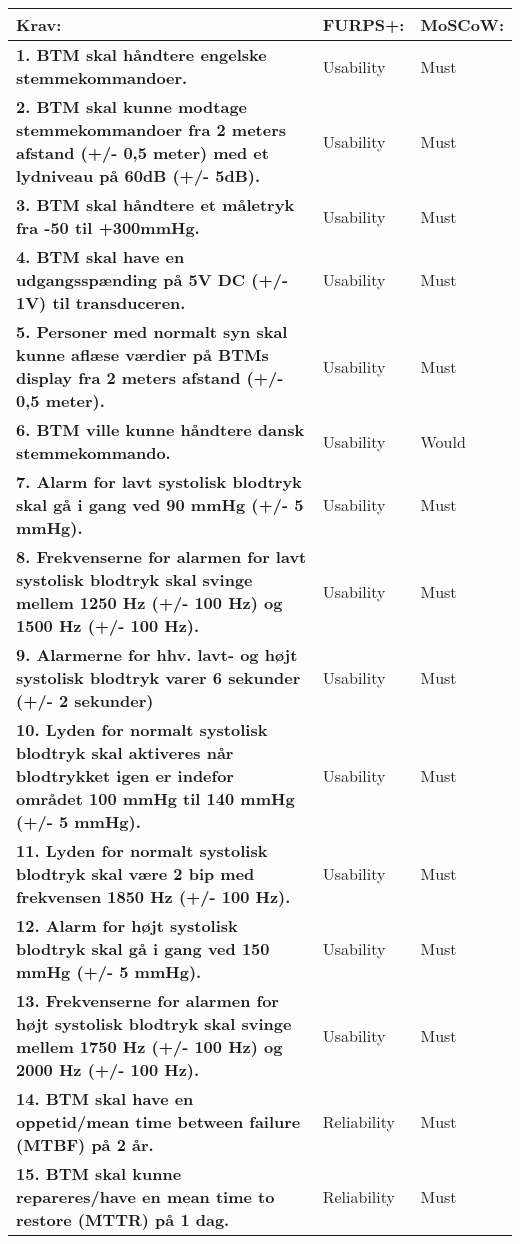 \begin{table} [htbp]
\centering
\begin{tabular}{|p{10cm}|l|l|}
\hline
\textbf{Krav:} & \textbf{FURPS+:} & \textbf{MoSCoW:} \\ \hline
\textbf{1. BTM skal håndtere engelske stemmekommandoer. } & Usability & Must \\\hline
\textbf{2. BTM skal kunne modtage stemmekommandoer fra 2 meters afstand (+/- 0,5 meter) med et lydniveau på 60dB (+/- 5dB).} & Usability & Must \\ \hline
\textbf{3. BTM skal håndtere et måletryk fra -50 til +300mmHg. }  & Usability & Must \\ \hline 
\textbf{4. BTM skal have en udgangsspænding på 5V DC (+/- 1V) til transduceren.} & Usability & Must \\ \hline
\textbf{5. Personer med normalt syn skal kunne aflæse værdier på BTMs display fra 2 meters afstand (+/- 0,5 meter). } & Usability & Must \\ \hline
\textbf{6. BTM ville kunne håndtere dansk stemmekommando.} & Usability & Would \\ \hline
\textbf{7. Alarm for lavt systolisk blodtryk skal gå i gang ved 90 mmHg (+/- 5 mmHg).} & Usability & Must \\ \hline
\textbf{8. Frekvenserne for alarmen for lavt systolisk blodtryk skal svinge mellem 1250 Hz (+/- 100 Hz) og 1500 Hz (+/- 100 Hz).} & Usability & Must \\ \hline
\textbf{9. Alarmerne for hhv. lavt- og højt systolisk blodtryk varer 6 sekunder (+/- 2 sekunder)} & Usability & Must \\ \hline
\textbf{10. Lyden for normalt systolisk blodtryk skal aktiveres når blodtrykket igen er indefor området 100 mmHg til 140 mmHg (+/- 5 mmHg).} & Usability & Must \\ \hline
\textbf{11. Lyden for normalt systolisk blodtryk skal være 2 bip med frekvensen 1850 Hz (+/- 100 Hz).} & Usability & Must \\ \hline
\textbf{12. Alarm for højt systolisk blodtryk skal gå i gang ved 150 mmHg (+/- 5 mmHg).} & Usability & Must \\ \hline
\textbf{13. Frekvenserne for alarmen for højt systolisk blodtryk skal svinge mellem 1750 Hz (+/- 100 Hz) og 2000 Hz (+/- 100 Hz).} & Usability & Must \\ \hline
\textbf{14. BTM skal have en oppetid/mean time between failure (MTBF) på  2 år. } & Reliability & Must \\ \hline
\textbf{15. BTM skal kunne repareres/have en mean time to restore (MTTR) på 1 dag. } & Reliability & Must \\ \hline

\end{tabular}
\end{table}
